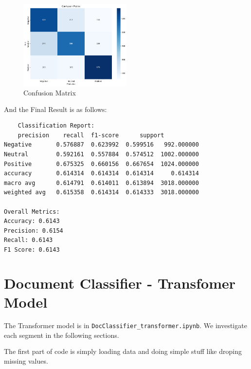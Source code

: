 \documentclass{solutionclass} %
\def\co#1{\texttt{#1}}
\begin{document}
\begin{figure}[h!]
    \caption{Confusion Matrix}
    \centering
    \includegraphics[width=0.5\textwidth]{img/conf.png}
\end{figure}


And the Final Result is as follows:

\begin{verbatim}
    Classification Report:
    precision    recall  f1-score      support
Negative       0.576887  0.623992  0.599516   992.000000
Neutral        0.592161  0.557884  0.574512  1002.000000
Positive       0.675325  0.660156  0.667654  1024.000000
accuracy       0.614314  0.614314  0.614314     0.614314
macro avg      0.614791  0.614011  0.613894  3018.000000
weighted avg   0.615358  0.614314  0.614333  3018.000000

Overall Metrics:
Accuracy: 0.6143
Precision: 0.6154
Recall: 0.6143
F1 Score: 0.6143
\end{verbatim}

\section{Document Classifier -  Transfomer Model}

The Transformer model is in \co{DocClassifier\_transformer.ipynb}. We investigate each segment in the following sections.

The first part of code is simply loading data and doing simple stuff like droping missing values.
\end{document}
